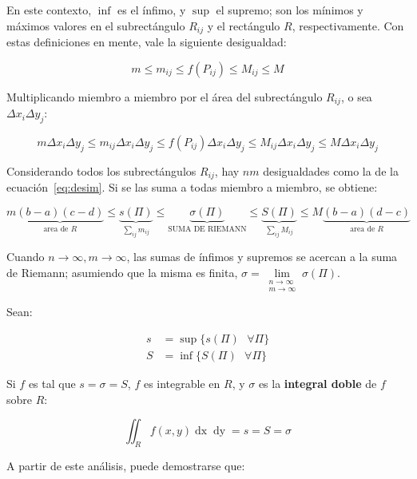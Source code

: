 \documentclass{article}
\begin{document}
En este contexto, $\inf$ es el ínfimo, y $\sup$ el supremo; son los mínimos y máximos valores en el subrectángulo $R_{ij}$ y el rectángulo $R$, respectivamente. Con estas definiciones en mente, vale la siguiente desigualdad:

\begin{equation}
m \leq m_{ij} \leq f(P_{ij}) \leq M_{ij} \leq M
\end{equation}

Multiplicando miembro a miembro por el área del subrectángulo $R_{ij}$, o sea $\Delta x_i \Delta y_j$:

\begin{equation}
m \Delta x_i \Delta y_j \leq m_{ij} \Delta x_i \Delta y_j \leq f(P_{ij}) \Delta x_i \Delta y_j \leq M_{ij} \Delta x_i \Delta y_j \leq M \Delta x_i \Delta y_j
\label{eq:desim}
\end{equation}

Considerando todos los subrectángulos $R_{ij}$, hay $n m$ desigualdades como la de la ecuación~\ref{eq:desim}. Si se las suma a todas miembro a miembro, se obtiene:

\begin{equation}
m \underbrace{(b-a) (c-d)}_{\text{area de } R} \leq \underbrace{ s(\Pi) }_{\sum_{ij} m_{ij}} \leq \underbrace{ \sigma(\Pi) }_{\text{SUMA DE RIEMANN}} \leq \underbrace{ S(\Pi) }_{\sum_{ij} M_{ij}} \leq M \underbrace{(b-a) (d-c)}_{\text{area de } R}
\end{equation}

Cuando $n \rightarrow \infty, m \rightarrow \infty$, las sumas de ínfimos y supremos se acercan a la suma de Riemann; asumiendo que la misma es finita, $\sigma = \lim\limits_{\substack{n \rightarrow \infty \\ m \rightarrow \infty}} \sigma(\Pi)$. 

Sean:

\begin{align}
s &= \sup\{ s(\Pi) \text{ } \forall \Pi \} \\
S &= \inf\{ S(\Pi) \text{ } \forall \Pi \}
\end{align}

Si $f$ es tal que $s = \sigma = S$, $f$ es integrable en $R$, y $\sigma$ es la \textbf{integral doble} de $f$ sobre $R$:

\begin{equation}
\iint_R f(x,y) \mathop{dx} \mathop{dy} = s = S = \sigma
\end{equation}

A partir de este análisis, puede demostrarse que:
\end{document}
